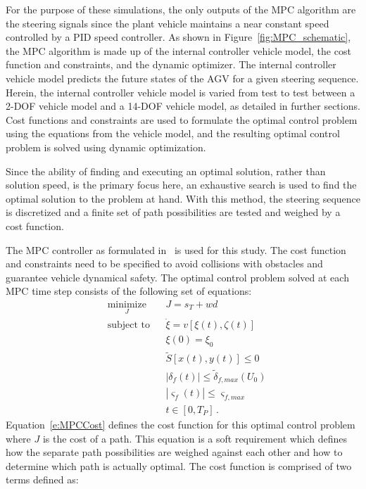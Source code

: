 \documentclass[12pt,onecolumn]{report}
\begin{document}
For the purpose of these simulations, the only outputs of the MPC algorithm are the steering signals since the plant vehicle maintains a near constant speed controlled by a PID speed controller. As shown in Figure~\ref{fig:MPC_schematic}, the MPC algorithm is made up of the internal controller vehicle model, the cost function and constraints, and the dynamic optimizer. The internal controller vehicle model predicts the future states of the AGV for a given steering sequence. Herein, the internal controller vehicle model is varied from test to test between a 2-DOF vehicle model and a 14-DOF vehicle model, as detailed in further sections. Cost functions and constraints are used to formulate the optimal control problem using the equations from the vehicle model, and the resulting optimal control problem is solved using dynamic optimization.

Since the ability of finding and executing an optimal solution, rather than solution speed, is the primary focus here, an exhaustive search is used to find the optimal solution to the problem at hand. With this method, the steering sequence is discretized and a finite set of path possibilities are tested and weighed by a cost function. 

The MPC controller as formulated in~\cite{ModelFidelity2016} is used for this study. The cost function and constraints need to be specified to avoid collisions with obstacles and guarantee vehicle dynamical safety. The optimal control problem solved at each MPC time step consists of the following set of equations:
%
\begin{align}
&\underset{J}{\text{minimize}} & & J = s_T + wd \label{e:MPCCost}\\
&\text{subject to} &&\dot{\xi} = v\left[\xi\left(t\right),\zeta\left(t\right)\right] \label{e:State_ODE}\\
&&& \xi\left(0\right) = \xi_0 \label{e:InitialStates}\\
&&& \tilde{S}\left[x\left(t\right),y\left(t\right)\right] \leq0 \label{e:SafeArea}\\ 
&&& \left|\delta_f\left(t\right)\right| \leq\tilde{\delta}_{f,max}\left(U_0\right) \label{e:SteerLimit}\\
&&& \left|\varsigma_f\left(t\right)\right| \leq\varsigma_{f,max} \label{e:SteerRateLimit}\\
&&& t \in \left[0,T_P\right] \,. \label{e:TimeDomain}
\end{align}
%
Equation~\eqref{e:MPCCost} defines the cost function for this optimal control problem where $J$ is the cost of a path. This equation is a soft requirement which defines how the separate path possibilities are weighed against each other and how to determine which path is actually optimal. The cost function is comprised of two terms defined as:
\end{document}
